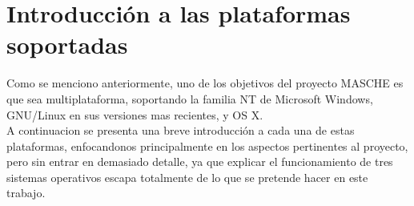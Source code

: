 \section{Introducción a las plataformas soportadas}

Como se menciono anteriormente, uno de los objetivos del proyecto MASCHE es que
sea multiplataforma, soportando la familia NT de Microsoft Windows, GNU/Linux
en sus versiones mas recientes, y OS X.\\

A continuacion se presenta una breve introducción a cada una de estas
plataformas, enfocandonos principalmente en los aspectos pertinentes al
proyecto, pero sin entrar en demasiado detalle, ya que explicar el
funcionamiento de tres sistemas operativos escapa totalmente de lo que se
pretende hacer en este trabajo.\\

